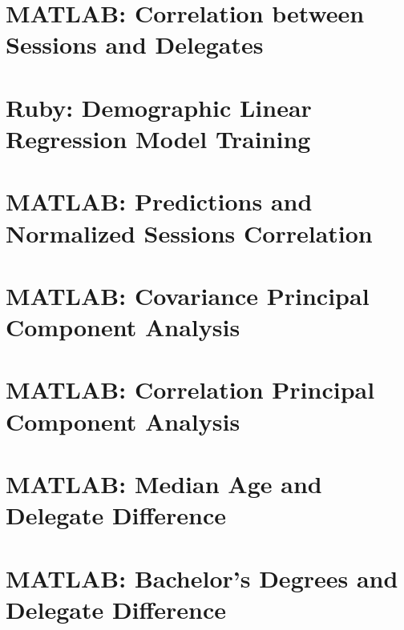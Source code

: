 \documentclass[11pt]{article}
\begin{document}
\section{MATLAB: Correlation between Sessions and Delegates}

\newpage

\section{Ruby: Demographic Linear Regression Model Training}

\newpage

\section{MATLAB: Predictions and Normalized Sessions Correlation}

\newpage

\section{MATLAB: Covariance Principal Component Analysis}

\newpage

\section{MATLAB: Correlation Principal Component Analysis}

\newpage

\section{MATLAB: Median Age and Delegate Difference}

\newpage

\section{MATLAB: Bachelor's Degrees and Delegate Difference}

\newpage

\nocite{*}


\end{document}
